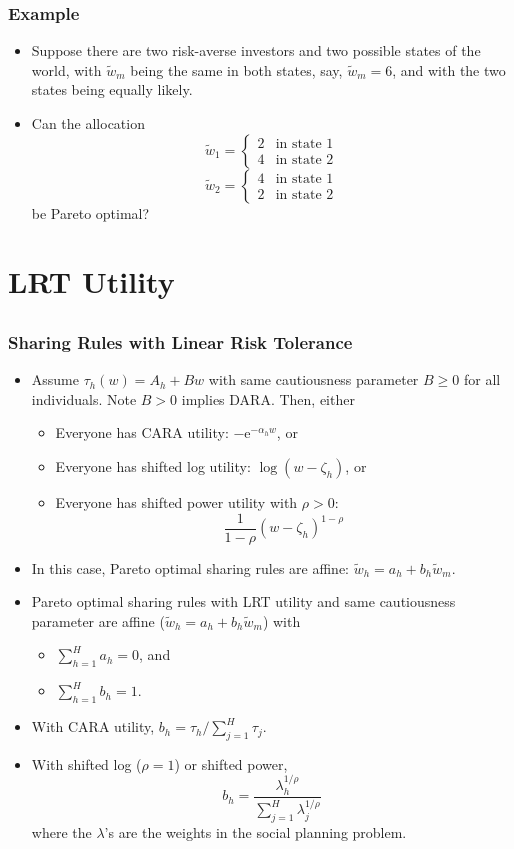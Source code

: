 \documentclass[10pt]{beamer}
\newcommand{\bi}{\begin{itemize}}
\newcommand{\ei}{\end{itemize}}
\newcommand{\im}{\item}
\newcommand{\E}{\mathrm{e}}
\newcommand{\bfr}{\begin{frame}}
\newcommand{\tw}{\tilde{w}}
\begin{document}
  \bfr\frametitle{Example}
  \bi 
  \im 
  Suppose there are two risk-averse investors and two possible states of the world, with  $\widetilde{w}_m$ being the same in both states, say, $\widetilde{w}_m=6$, and with the two states being equally likely.  
  \im Can the allocation
  $$\widetilde{w}_1 = \begin{cases} 2 & \text{in state~1}\\
  4 & \text{in state~2}
  \end{cases}$$
  $$\widetilde{w}_2 = \begin{cases} 4 & \text{in state~1}\\
  2 & \text{in state~2}
  \end{cases}$$
  be Pareto optimal?
  \ei
  \end{frame}
  
  \section{LRT Utility}\subsection{}
  
  \bfr\frametitle{Sharing Rules with Linear Risk Tolerance}
  \bi 
  \im Assume $\tau_h(w) = A_h + B w$ with same cautiousness parameter $B\ge 0$ for all individuals.  Note $B>0$ implies DARA.  Then, either
  \bi
  \im Everyone has CARA utility: $-\E^{-\alpha_h w}$, or
  \im Everyone has shifted log utility:  $\log (w- \zeta_h)$, or
  \im Everyone has shifted power utility with $\rho>0$: 
  $$\frac{1}{1-\rho} (w-\zeta_h)^{1-\rho}$$
  \ei
  \im 
  In this case, Pareto optimal sharing rules are affine: $\tw_h = a_h + b_h \tw_m$.
  \ei 
  \end{frame}
  
  \begin{frame}
    \bi 
  \im Pareto optimal sharing rules with LRT utility and same cautiousness parameter are affine ($\tw_h = a_h + b_h \tw_m$) with
  \bi
  \im $\sum_{h=1}^H a_h = 0$, and
  \im $\sum_{h=1}^H b_h = 1$.
  \ei
  
  \im With CARA utility, $b_h = \tau_h / \sum_{j=1}^H \tau_j$.  
  
  \im With shifted log ($\rho=1$) or shifted power,
  $$b_h =  \frac{\lambda_h^{1/\rho }}{\sum_{j=1}^H \lambda_j^{1/\rho }}$$
  where the $\lambda$'s are the weights in the social planning problem. 
  \ei
  \end{frame}
  
\end{document}
